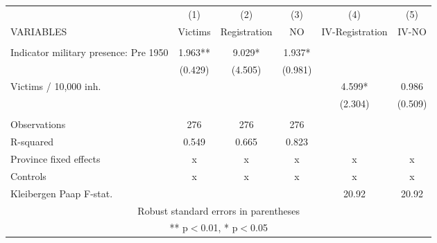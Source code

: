 \begin{tabular}{lccccc} \hline
 & (1) & (2) & (3) & (4) & (5) \\
VARIABLES & Victims & Registration & NO & IV-Registration & IV-NO \\ \hline
 &  &  &  &  &  \\
Indicator military presence: Pre 1950 & 1.963** & 9.029* & 1.937* &  &  \\
 & (0.429) & (4.505) & (0.981) &  &  \\
Victims / 10,000 inh. &  &  &  & 4.599* & 0.986 \\
 &  &  &  & (2.304) & (0.509) \\
 &  &  &  &  &  \\
Observations & 276 & 276 & 276 &  &  \\
R-squared & 0.549 & 0.665 & 0.823 &  &  \\
Province fixed effects & x & x & x & x & x \\
Controls & x & x & x & x & x \\
 Kleibergen Paap F-stat. &  &  &  & 20.92 & 20.92 \\ \hline
\multicolumn{6}{c}{ Robust standard errors in parentheses} \\
\multicolumn{6}{c}{ ** p$<$0.01, * p$<$0.05} \\
\end{tabular}
